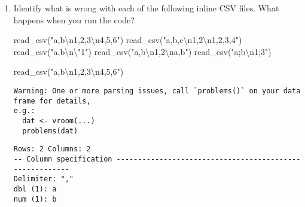 \documentclass[
  letterpaper,
  DIV=11,
  numbers=noendperiod]{scrreprt}
\newenvironment{Shaded}{\begin{snugshade}}{\end{snugshade}}
\newcommand{\FunctionTok}[1]{\textcolor[rgb]{0.28,0.35,0.67}{#1}}
\newcommand{\NormalTok}[1]{\textcolor[rgb]{0.00,0.23,0.31}{#1}}
\newcommand{\SpecialCharTok}[1]{\textcolor[rgb]{0.37,0.37,0.37}{#1}}
\newcommand{\StringTok}[1]{\textcolor[rgb]{0.13,0.47,0.30}{#1}}
\begin{document}
\begin{enumerate}
\begin{tcolorbox}
  \end{tcolorbox}
\item
  Identify what is wrong with each of the following inline CSV files.
  What happens when you run the code?

\begin{Shaded}
\begin{Highlighting}[]
\FunctionTok{read\_csv}\NormalTok{(}\StringTok{"a,b}\SpecialCharTok{\textbackslash{}n}\StringTok{1,2,3}\SpecialCharTok{\textbackslash{}n}\StringTok{4,5,6"}\NormalTok{)}
\FunctionTok{read\_csv}\NormalTok{(}\StringTok{"a,b,c}\SpecialCharTok{\textbackslash{}n}\StringTok{1,2}\SpecialCharTok{\textbackslash{}n}\StringTok{1,2,3,4"}\NormalTok{)}
\FunctionTok{read\_csv}\NormalTok{(}\StringTok{"a,b}\SpecialCharTok{\textbackslash{}n\textbackslash{}"}\StringTok{1"}\NormalTok{)}
\FunctionTok{read\_csv}\NormalTok{(}\StringTok{"a,b}\SpecialCharTok{\textbackslash{}n}\StringTok{1,2}\SpecialCharTok{\textbackslash{}n}\StringTok{a,b"}\NormalTok{)}
\FunctionTok{read\_csv}\NormalTok{(}\StringTok{"a;b}\SpecialCharTok{\textbackslash{}n}\StringTok{1;3"}\NormalTok{)}
\end{Highlighting}
\end{Shaded}

  \begin{tcolorbox}[enhanced jigsaw, breakable, bottomtitle=1mm, left=2mm, colback=white, toprule=.15mm, leftrule=.75mm, colframe=quarto-callout-note-color-frame, colbacktitle=quarto-callout-note-color!10!white, title={Answer}, coltitle=black, toptitle=1mm, bottomrule=.15mm, opacitybacktitle=0.6, arc=.35mm, rightrule=.15mm, titlerule=0mm, opacityback=0]

\begin{Shaded}
\begin{Highlighting}[]
\FunctionTok{read\_csv}\NormalTok{(}\StringTok{"a,b}\SpecialCharTok{\textbackslash{}n}\StringTok{1,2,3}\SpecialCharTok{\textbackslash{}n}\StringTok{4,5,6"}\NormalTok{)}
\end{Highlighting}
\end{Shaded}

\begin{verbatim}
Warning: One or more parsing issues, call `problems()` on your data frame for details,
e.g.:
  dat <- vroom(...)
  problems(dat)
\end{verbatim}

\begin{verbatim}
Rows: 2 Columns: 2
-- Column specification --------------------------------------------------------
Delimiter: ","
dbl (1): a
num (1): b


\end{verbatim}
\end{tcolorbox}
\end{enumerate}
\end{document}
